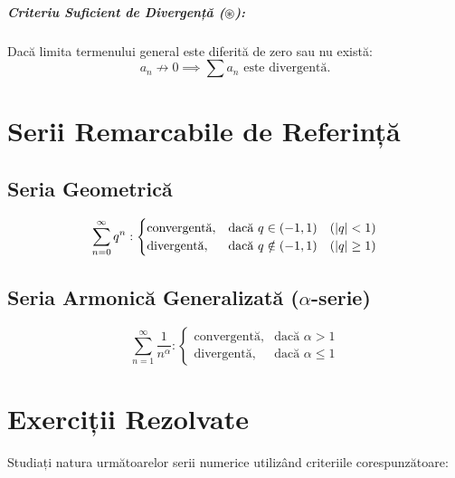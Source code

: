 \documentclass[12pt, a4paper]{report}
\DeclarePairedDelimiter\abs{\lvert}{\rvert}
\begin{document}
	\paragraph{Criteriu Suficient de Divergență ($\circledast$):}
	Dacă limita termenului general este diferită de zero sau nu există:
	\[
	a_n \not\to 0 \implies \sum a_n \text{ este divergentă.}
	\]
	
	
	\chapter{Serii Remarcabile de Referință}
	
	\section{Seria Geometrică}
	\[
	\sum_{n=0}^{\infty} q^n : \begin{cases} 
		\text{convergentă}, & \text{dacă } q \in (-1, 1) \quad (\abs{q} < 1) \\ 
		\text{divergentă}, & \text{dacă } q \notin (-1, 1) \quad (\abs{q} \ge 1)
	\end{cases}
	\]
	
	\section{Seria Armonică Generalizată ($\alpha$-serie)}
	\[
	\sum_{n=1}^{\infty} \frac{1}{n^\alpha} : \begin{cases} 
		\text{convergentă}, & \text{dacă } \alpha > 1 \\ 
		\text{divergentă}, & \text{dacă } \alpha \le 1
	\end{cases}
	\]
	
	
	\chapter{Exerciții Rezolvate}
	
	Studiați natura următoarelor serii numerice utilizând criteriile corespunzătoare:
	
\end{document}
